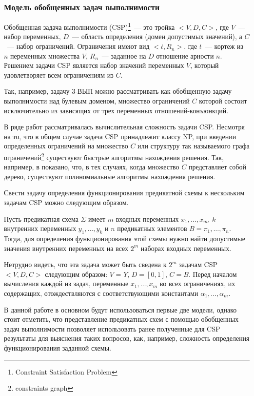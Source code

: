 \documentclass[12pt]{extarticle}
\newenvironment{definition}[1][Определение.]{\begin{trivlist}
\item[\hskip \labelsep {\bfseries #1}]}{\end{trivlist}}
\begin{document}
\subsubsection*{Модель обобщенных задач выполнимости}

\begin{definition}
Обобщенная задача выполнимости (CSP)\footnote{Constraint Satisfaction Problem}~--- это тройка $<V,D,C>$, где $V$~--- набор переменных, $D$~--- область определения (домен допустимых значений), 
а $C$~--- набор ограничений. Ограничения имеют вид $<t, R_n>$, где $t$~--- кортеж из $n$ переменных множества $V$, 
$R_n$~--- заданное на $D$ отношение арности $n$. 
Решением задачи CSP является набор значений переменных $V$, который удовлетворяет всем ограничениям из $C$. 
\end{definition}

Так, например, задачу 3-ВЫП можно рассматривать как обобщенную задачу выполнимости над булевым доменом, множество
ограничений $C$ которой состоит исключительно из зависящих от трех переменных отношений-конъюнкций.

В ряде работ рассматривалась вычислительная сложность задачи CSP. Несмотря на то, что в общем случае задача CSP
принадлежит классу NP, при введении определенных ограничений на множество $C$ или структуру так называемого
графа ограничений\footnote{constraints graph} существуют быстрые алгоритмы нахождения решения. 
Так, например, в \cite{Shaeffer78} показано, 
что, в тех случаях, когда множество $C$ представляет собой дерево, существуют полиномиальные алгоритмы нахождения решения.

Свести задачу определения функционирования предикатной схемы к нескольким задачам CSP можно следующим образом.

Пусть предикатная схема $\Sigma$ имеет $m$ входных переменных $x_1, \ldots , x_m$, 
$k$ внутренних переменных $y_1, \ldots , y_k$ и $n$ предикатных элементов $B = \pi_1, \dots , \pi_n$. 
Тогда, для определения функционирования этой схемы нужно найти допустимые значения внутренних переменных на всех $2^{m}$
наборах входных переменных. 

Нетрудно видеть, что эта задача может быть сведена к $2^m$ задачам CSP $<V, D, C>$ следующим образом:
$V$ = $Y$, $D = [0, 1]$, $C = B$. Перед началом вычисления каждой из задач, переменные $x_1, \ldots , x_m$ 
во всех ограничениях, их содержащих, отождествляются с соответствующими константами $\alpha_1, \ldots , \alpha_m$.

В данной работе в основном будут использоваться первые две модели, однако стоит отметить, что представление предикатных
схем с помощью обобщенных задач выполнимости позволяет использовать ранее полученные для CSP результаты для 
выяснения таких вопросов, как, например, сложность определения функционирования заданной схемы.
\end{document}

